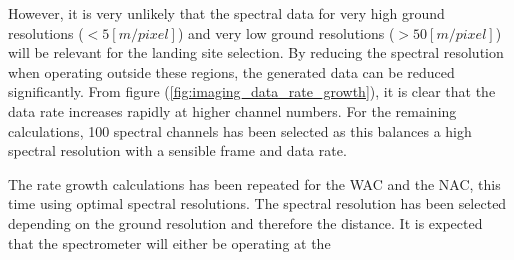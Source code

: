 However, it is very unlikely that the spectral data for very high ground resolutions ($<5[m/pixel]$) and very low ground resolutions ($>50[m/pixel]$) will be relevant for the landing site selection. By reducing the spectral resolution when operating outside these regions, the generated data can be reduced significantly. From figure (\ref{fig:imaging_data_rate_growth}), it is clear that the data rate increases rapidly at higher channel numbers. For the remaining calculations, 100 spectral channels has been selected as this balances a high spectral resolution with a sensible frame and data rate.
\begin{table}[htb!]
  \centering
  \caption{The rate growth for the WAC, when optimal spectral resolution is selected.}
  \label{tab:opt_rate_growth_wac}%
\end{table}%
 The rate growth calculations has been repeated for the WAC and the NAC, this time using optimal spectral resolutions. The spectral resolution has been selected depending on the ground resolution and therefore the distance. It is expected that the spectrometer will either be operating at the 
